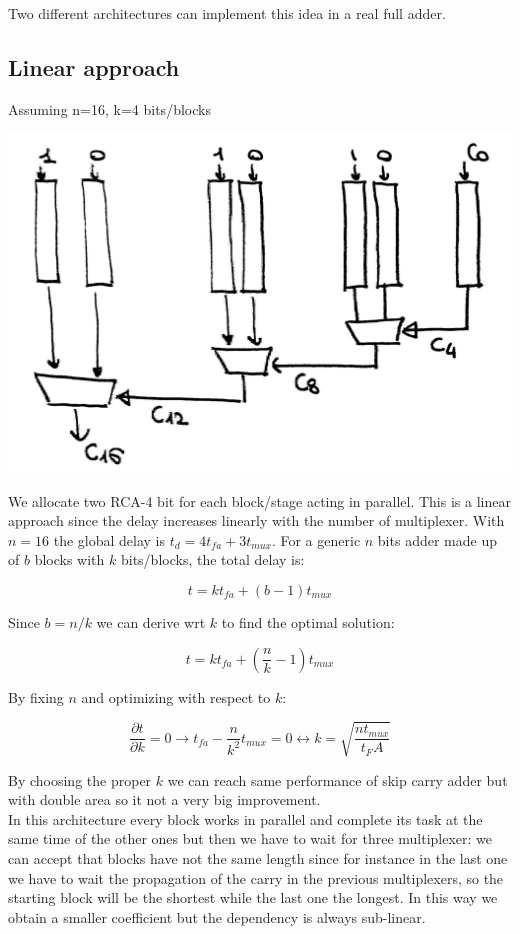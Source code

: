  Two different architectures can implement this idea in a real full adder.

 \subsection{Linear approach}

Assuming n=16, k=4 bits/blocks

\begin{center}
  \includegraphics[width=0.7\linewidth]{img/img2/8}
\end{center}

 We allocate two RCA-4 bit for each block/stage acting in parallel. This is a linear approach since the delay increases linearly with the number of multiplexer.
 With $n=16$ the global delay is $t_d=4t_{fa}+3t_{mux}$. For a generic $n$ bits adder made up of $b$ blocks with $k$ bits/blocks, the total delay is:

 $$t=kt_{fa}+(b-1)t_{mux}$$

Since $b=n/k$ we can derive wrt $k$ to find the optimal solution:

$$t=kt_{fa}+(\frac{n}{k}-1)t_{mux}$$

By fixing $n$ and optimizing with respect to $k$:

$$ \frac{\partial t}{\partial k} = 0 \longrightarrow  t_{fa}- \frac{n}{k^2} t_{mux}=0 \longleftrightarrow k=\sqrt{\frac{nt_{mux}}{t_FA}} $$

By choosing the proper $k$ we can reach same performance of skip carry adder but with double area so it not a very big improvement.\\

In this architecture every block works in parallel and complete its task at the same time of the other ones but then we have to wait for three multiplexer: we can accept that blocks have not the same length since for instance in the last one we have to wait the propagation of the carry in the previous multiplexers, so the starting block will be the shortest while the last one the longest. In this way we obtain a smaller coefficient but the dependency is always sub-linear.

